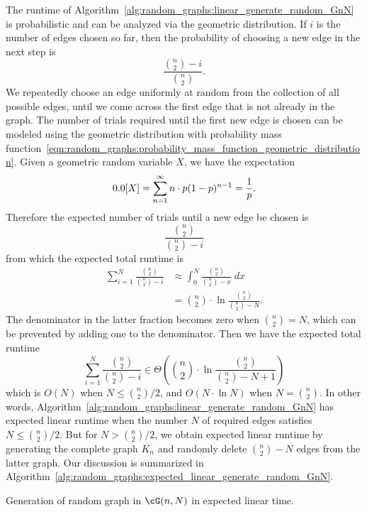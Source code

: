 The runtime of
Algorithm~\ref{alg:random_graphs:linear_generate_random_GnN} is
probabilistic and can be analyzed via the
geometric distribution. If $i$ is the
number of edges chosen so far, then the probability of choosing a new
edge in the next step is
\[
\frac{\binom{n}{2} - i} {\binom{n}{2}}.
\]
We repeatedly choose an edge uniformly at random from the collection
of all possible edges, until we come across the first edge that is not
already in the graph. The number of trials required until the first
new edge is chosen can be modeled using the geometric distribution
with probability mass
function~\eqref{eqn:random_graphs:probability_mass_function_geometric_distribution}.
Given a geometric random variable $X$, we have the expectation
\[
\E[X]
=
\sum_{n=1}^\infty n \cdot p(1 - p)^{n-1}
=
\frac{1}{p}.
\]
Therefore the expected number of trials until a new edge be chosen is
\[
\frac{\binom{n}{2}} {\binom{n}{2} - i}
\]
from which the expected total runtime is
\begin{align*}
\label{eqn:random_graphs:Erdos_Renyi_expected_total_runtime_sum}
\sum_{i=1}^N \frac{\binom{n}{2}} {\binom{n}{2} - i}
&\approx
\int_0^N \frac{\binom{n}{2}} {\binom{n}{2} - x} \; dx \\[4pt]
&=
\binom{n}{2} \cdot \ln \frac{\binom{n}{2}} {\binom{n}{2} - N}.
\end{align*}
The denominator in the latter fraction becomes zero when
$\binom{n}{2} = N$, which can be prevented by adding one to the
denominator. Then we have the expected total runtime
\[
\sum_{i=1}^N \frac{\binom{n}{2}} {\binom{n}{2} - i}
\in
\Theta
\left(
  \binom{n}{2} \cdot \ln \frac{\binom{n}{2}} {\binom{n}{2} - N + 1}
\right)
\]
which is $O(N)$ when $N \leq \binom{n}{2} / 2$, and $O(N \cdot \ln N)$
when $N = \binom{n}{2}$. In other words,
Algorithm~\ref{alg:random_graphs:linear_generate_random_GnN} has
expected linear runtime when the number $N$ of required edges
satisfies $N \leq \binom{n}{2} / 2$. But for $N > \binom{n}{2} / 2$,
we obtain expected linear runtime by generating the
complete graph $K_n$ and randomly delete
$\binom{n}{2} - N$ edges from the latter graph. Our discussion is
summarized in
Algorithm~\ref{alg:random_graphs:expected_linear_generate_random_GnN}.

\begin{algorithm}[!htbp]

\caption{Generation of random graph in $\cG(n,N)$ in expected linear time.}
\label{alg:random_graphs:expected_linear_generate_random_GnN}
\end{algorithm}

